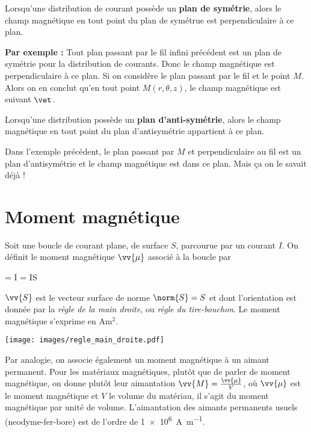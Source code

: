 \documentclass{cours}
\begin{document}
  Lorsqu'une distribution de courant possède un \textbf{plan de symétrie}, alors le champ magnétique en tout point du plan de symétrue est perpendiculaire à ce plan. 

  \textbf{Par exemple : } Tout plan passant par le fil infini précédent est un plan de symétrie pour la distribution de courants. Donc le champ magnétique est perpendiculaire à ce plan. Si on considère le plan passant par le fil et le point $M$. Alors on en conclut qu'en tout point $M(r, \theta, z)$, le champ magnétique est suivant $\vet$.     

  Lorsqu'une distribution possède un \textbf{plan d'anti-symétrie}, alors le champ magnétique en tout point du plan d'antisymétrie appartient à ce plan.

  Dans l'exemple précédent, le plan passant par $M$ et perpendiculaire au fil est un plan d'antisymétrie et le champ magnétique est dans ce plan. Mais ça on le savait déjà !

\section{Moment magnétique}%
\label{sec:moment_magnetique}

Soit une boucle de courant plane, de surface $S$, parcourue par un courant $I$. On définit le moment magnétique $\vv{\mu}$ associé à la boucle par 

\begin{eqencadre}
  \vv{\mu} = I  = IS
\end{eqencadre}
$\vv{S}$ est le vecteur surface de norme $\norm{S}=S$ et dont l'orientation est donnée par la \emph{règle de la main droite}, ou \emph{règle du tire-bouchon}. Le moment magnétique s'exprime en $\si{\ampere\square\meter}$. 

\begin{center}
  \hspace{3em}
  \texttt{[image: images/regle\_main\_droite.pdf]}

\end{center}
Par analogie, on associe également un moment magnétique à un aimant permanent. Pour les matériaux magnétiques, plutôt que de parler de moment magnétique, on donne plutôt leur aimantation $\vv{M} = \frac{\vv{\mu}}{V}$, où $\vv{\mu}$ est le moment magnétique et $V$ le volume du matériau, il s'agit du moment magnétique par unité de volume. L'aimantation des aimants permanents usuels (neodyme-fer-bore) est de l'ordre de \SI{1e6}{\ampere\per\meter}.
\end{document}
